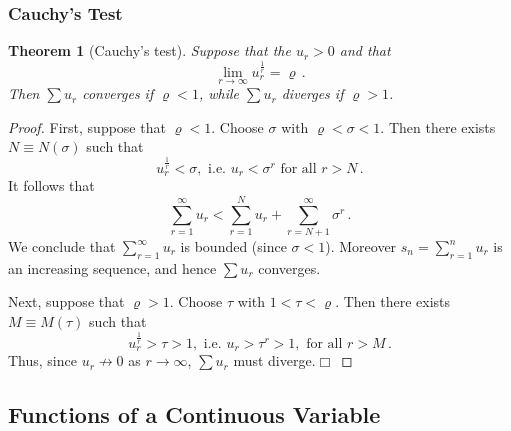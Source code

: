 \documentclass{article}
\theoremstyle{plain}\theoremheaderfont{\normalfont\itshape}\theorembodyfont{\rmfamily}\theoremseparator{.}\newtheorem*{rem}{Remark}\newtheorem*{ex}{Example}\newtheorem*{proof}{Proof}\newtheorem*{altp}{Alternative proof}
\theoremstyle{plain}\theoremheaderfont{\normalfont\bfseries}\theorembodyfont{\rmfamily}\theoremseparator{.}\newtheorem{thm}{Theorem}[section]\newtheorem{lem}[thm]{Lemma}\newtheorem{prop}[thm]{Proposition}\newtheorem*{cor}{Corollary}\newtheorem{defn}[thm]{Definition}\newtheorem{clm}[thm]{Claim}\newtheorem{clminproof}{Claim}
\theoremstyle{break}\theoremheaderfont{\normalfont\itshape}\theorembodyfont{\rmfamily}\theoremseparator{.\medskip}\newtheorem*{proofskip}{Proof}\newtheorem*{exs}{Examples}\newtheorem*{rems}{Remarks}
\theoremstyle{break}\theoremheaderfont{\normalfont\bfseries}\theorembodyfont{\rmfamily}\theoremseparator{.\medskip}\newtheorem{lemskip}[thm]{Lemma}\newtheorem{defnskip}[thm]{Definition}\newtheorem{propskip}[thm]{Proposition}\newtheorem{thmskip}[thm]{Theorem}
\numberwithin{equation}{section}
\newcommand{\qed}{\hfill\ensuremath{\Box}}
\begin{document}
	\subsubsection{Cauchy's Test}
	\begin{thm}[Cauchy's test]		
		Suppose that the \(u_r>0\) and that
		\[\lim_{r\to\infty}u_r^{\frac{1}{r}}=\varrho\,.\]
		Then \(\sum u_r\) converges if \(\varrho<1\), while \(\sum u_r\) diverges if \(\varrho>1\).
	\end{thm}
	\begin{proof}
		First, suppose that \(\varrho<1\). Choose \(\sigma\) with \(\varrho<\sigma<1\). Then there exists \(N\equiv N(\sigma)\) such that
		\[u_r^{\frac{1}{r}}<\sigma,\text{ i.e. }u_r<\sigma^r\text{ for all }r>N\,.\]
		It follows that
		\[\sum_{r=1}^{\infty}u_r<\sum_{r=1}^{N}u_r+\sum_{r=N+1}^{\infty}\sigma^r\,.\]
		We conclude that \(\sum_{r=1}^{\infty}u_r\) is bounded (since \(\sigma<1\)). Moreover \(s_n=\sum_{r=1}^{n}u_r\) is an increasing sequence, and hence \(\sum u_r\) converges.
		
		Next, suppose that \(\varrho>1\). Choose \(\tau\) with \(1<\tau<\varrho\). Then there exists \(M\equiv M(\tau)\) such that
		\[u_r^{\frac{1}{r}}>\tau>1,\text{ i.e. }u_r>\tau^r>1,\text{ for all }r>M\,.\]
		Thus, since \(u_r\not\to 0\) as \(r\to\infty\), \(\sum u_r\) must diverge.\qed
	\end{proof}
	\subsection{Functions of a Continuous Variable}
\end{document}
